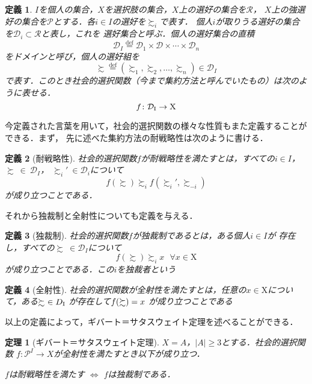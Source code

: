 \documentclass[dvipdfmx]{jsarticle}
\newtheorem*{THeorem}{定理}
\newtheorem*{DEfinition}{定義}
\begin{document}
\begin{DEfinition}
  $I$を個人の集合，$X$を選択肢の集合，$X$上の選好の集合を$\mathcal{R}$，
  $X$上の強選好の集合を$\mathcal{P}$とする．各$i \in I$の選好を$\succsim_i$で表す．
  個人$i$が取りうる選好の集合を$\mathcal{D}_i \subset \mathcal{R}$と表し，これを
  選好集合と呼ぶ．個人の選好集合の直積
  \[
    \mathcal{D}_I \stackrel{\mathrm{def}}{=} \mathcal{D}_1 \times
    \mathcal{D} \times \cdots \times \mathcal{D}_n
  \]
  をドメインと呼び，個人の選好組を
  \[
    \succsim \stackrel{\mathrm{def}}{=} (\succsim_1, \succsim_2, \ldots, \succsim_n)
      \in \mathcal{D}_I
  \]
  で表す．このとき社会的選択関数（今まで集約方法と呼んでいたもの）は次のように表せる．
  \[
    {\mathnormal{f}}\colon \mathcal{D}_{\mathrm{I}} \to \mathrm{X}
  \]
\end{DEfinition}

今定義された言葉を用いて，社会的選択関数の様々な性質もまた定義することができる．まず，
先に述べた集約方法の耐戦略性は次のように書ける．

\begin{DEfinition}[耐戦略性]
  社会的選択関数$f$が耐戦略性を満たすとは，すべての$i \in I$，$\succsim\ \in \ \mathcal{D}_I$，
  $\succsim_{i}'\ \in \mathcal{D}_i$について
  \[
    f(\succsim) \succsim_{i} f(\succsim_{i}',\succsim_{-i})
  \]
  が成り立つことである．
\end{DEfinition}

それから独裁制と全射性についても定義を与える．

\begin{DEfinition}[独裁制]
  社会的選択関数$f$が独裁制であるとは，ある個人$i \in I$が
  存在し，すべての$\succsim\  \in \mathcal{D}_I$について
  \[
    f(\succsim)\succsim_i x\hspace{8pt} \forall x \in \mathrm{X}  
  \]
  が成り立つことである．この$i$を独裁者という
\end{DEfinition}

\begin{DEfinition}[全射性]
  社会的選択関数が全射性を満たすとは，任意の$x \in \mathrm{X}$について，ある$\succsim \ \in \mathnormal{D}_{\mathrm{I}}$
  が存在して$\mathnormal{f}(\succsim) = x$
  が成り立つことである
\end{DEfinition}

以上の定義によって，ギバート＝サタスウェイト定理を述べることができる．

\begin{THeorem}[ギバート＝サタスウェイト定理]
  $X = A$，$|A| \geq 3$とする．社会的選択関数
  $f\colon \mathcal{P}^{I} \to X$が全射性を満たすとき以下が成り立つ．
  \begin{center}
    $f$は耐戦略性を満たす $\Leftrightarrow$ $f$は独裁制である．
  \end{center}
\end{THeorem}
\end{document}
